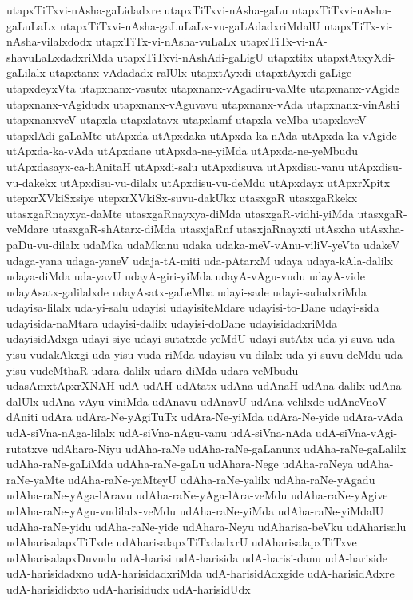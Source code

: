 {utapxTiTxvi-nAsha-gaLidadxre
utapxTiTxvi-nAsha-gaLu
utapxTiTxvi-nAsha-gaLuLaLx
utapxTiTxvi-nAsha-gaLuLaLx-vu-gaLAdadxriMdalU
utapxTiTx-vi-nAsha-vilalxdodx
utapxTiTx-vi-nAsha-vuLaLx
utapxTiTx-vi-nA-shavuLaLxdadxriMda
utapxTiTxvi-nAshAdi-gaLigU
utapxtitx
utapxtAtxyXdi-gaLilalx
utapxtanx-vAdadadx-ralUlx
utapxtAyxdi
utapxtAyxdi-gaLige
utapxdeyxVta
utapxnanx-vasutx
utapxnanx-vAgadiru-vaMte
utapxnanx-vAgide
utapxnanx-vAgidudx
utapxnanx-vAguvavu
utapxnanx-vAda
utapxnanx-vinAshi
utapxnanxveV
utapxla
utapxlatavx
utapxlamf
utapxla-veMba
utapxlaveV
utapxlAdi-gaLaMte
utApxda
utApxdaka
utApxda-ka-nAda
utApxda-ka-vAgide
utApxda-ka-vAda
utApxdane
utApxda-ne-yiMda
utApxda-ne-yeMbudu
utApxdasayx-ca-hAnitaH
utApxdi-salu
utApxdisuva
utApxdisu-vanu
utApxdisu-vu-dakekx
utApxdisu-vu-dilalx
utApxdisu-vu-deMdu
utApxdayx
utApxrXpitx
utepxrXVkiSxsiye
utepxrXVkiSx-suvu-dakUkx
utasxgaR
utasxgaRkekx
utasxgaRnayxya-daMte
utasxgaRnayxya-diMda
utasxgaR-vidhi-yiMda
utasxgaR-veMdare
utasxgaR-shAtarx-diMda
utasxjaRnf
utasxjaRnayxti
utAsxha
utAsxha-paDu-vu-dilalx
udaMka
udaMkanu
udaka
udaka-meV-vAnu-viliV-yeVta
udakeV
udaga-yana
udaga-yaneV
udaja-tA-miti
uda-pAtarxM
udaya
udaya-kAla-dalilx
udaya-diMda
uda-yavU
udayA-giri-yiMda
udayA-vAgu-vudu
udayA-vide
udayAsatx-galilalxde
udayAsatx-gaLeMba
udayi-sade
udayi-sadadxriMda
udayisa-lilalx
uda-yi-salu
udayisi
udayisiteMdare
udayisi-to-Dane
udayi-sida
udayisida-naMtara
udayisi-dalilx
udayisi-doDane
udayisidadxriMda
udayisidAdxga
udayi-siye
udayi-sutatxde-yeMdU
udayi-sutAtx
uda-yi-suva
uda-yisu-vudakAkxgi
uda-yisu-vuda-riMda
udayisu-vu-dilalx
uda-yi-suvu-deMdu
uda-yisu-vudeMthaR
udara-dalilx
udara-diMda
udara-veMbudu
udasAmxtApxrXNAH
udA
udAH
udAtatx
udAna
udAnaH
udAna-dalilx
udAna-dalUlx
udAna-vAyu-viniMda
udAnavu
udAnavU
udAna-velilxde
udAneVnoV-dAniti
udAra
udAra-Ne-yAgiTuTx
udAra-Ne-yiMda
udAra-Ne-yide
udAra-vAda
udA-siVna-nAga-lilalx
udA-siVna-nAgu-vanu
udA-siVna-nAda
udA-siVna-vAgi-rutatxve
udAhara-Niyu
udAha-raNe
udAha-raNe-gaLanunx
udAha-raNe-gaLalilx
udAha-raNe-gaLiMda
udAha-raNe-gaLu
udAhara-Nege
udAha-raNeya
udAha-raNe-yaMte
udAha-raNe-yaMteyU
udAha-raNe-yalilx
udAha-raNe-yAgadu
udAha-raNe-yAga-lAravu
udAha-raNe-yAga-lAra-veMdu
udAha-raNe-yAgive
udAha-raNe-yAgu-vudilalx-veMdu
udAha-raNe-yiMda
udAha-raNe-yiMdalU
udAha-raNe-yidu
udAha-raNe-yide
udAhara-Neyu
udAharisa-beVku
udAharisalu
udAharisalapxTiTxde
udAharisalapxTiTxdadxrU
udAharisalapxTiTxve
udAharisalapxDuvudu
udA-harisi
udA-harisida
udA-harisi-danu
udA-hariside
udA-harisidadxno
udA-harisidadxriMda
udA-harisidAdxgide
udA-harisidAdxre
udA-harisididxto
udA-harisidudx
udA-harisidUdx
}
